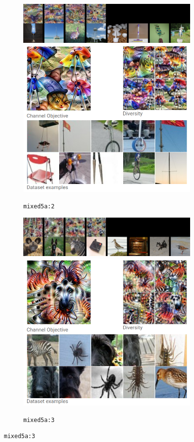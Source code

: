 \documentclass[12pt]{article}
\begin{document}
\begin{figure}[p!]\ContinuedFloat
  \centering
  \vspace{-1.5em}

  \begin{subfigure}{\linewidth}
    \centering
    \includegraphics[width=\linewidth]{fig/mixed5a_2.png}
    \includegraphics[width=0.4\linewidth]{fig/olah_mixed5a_2.png}
    \caption{\texttt{mixed5a:2}}
  \end{subfigure}
  
  \vspace{0.5em}

  \begin{subfigure}{\linewidth}
    \centering
    \includegraphics[width=\linewidth]{fig/mixed5a_3.png}
    \includegraphics[width=0.5\linewidth]{fig/olah_mixed5a_3.png}
    \caption{\texttt{mixed5a:3}}
  \end{subfigure}

\end{figure}
\end{document}
